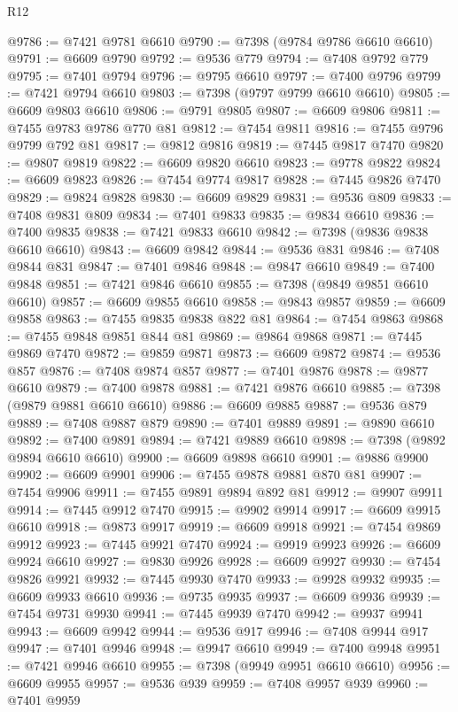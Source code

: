 \begin{lexlean}{R12}
\begin{coremodule}
@9786 := @7421 @9781 @6610
@9790 := @7398 (@9784 @9786 @6610 @6610)
@9791 := @6609 @9790
@9792 := @9536 @779
@9794 := @7408 @9792 @779
@9795 := @7401 @9794
@9796 := @9795 @6610
@9797 := @7400 @9796
@9799 := @7421 @9794 @6610
@9803 := @7398 (@9797 @9799 @6610 @6610)
@9805 := @6609 @9803 @6610
@9806 := @9791 @9805
@9807 := @6609 @9806
@9811 := @7455 @9783 @9786 @770 @81
@9812 := @7454 @9811
@9816 := @7455 @9796 @9799 @792 @81
@9817 := @9812 @9816
@9819 := @7445 @9817 @7470
@9820 := @9807 @9819
@9822 := @6609 @9820 @6610
@9823 := @9778 @9822
@9824 := @6609 @9823
@9826 := @7454 @9774 @9817
@9828 := @7445 @9826 @7470
@9829 := @9824 @9828
@9830 := @6609 @9829
@9831 := @9536 @809
@9833 := @7408 @9831 @809
@9834 := @7401 @9833
@9835 := @9834 @6610
@9836 := @7400 @9835
@9838 := @7421 @9833 @6610
@9842 := @7398 (@9836 @9838 @6610 @6610)
@9843 := @6609 @9842
@9844 := @9536 @831
@9846 := @7408 @9844 @831
@9847 := @7401 @9846
@9848 := @9847 @6610
@9849 := @7400 @9848
@9851 := @7421 @9846 @6610
@9855 := @7398 (@9849 @9851 @6610 @6610)
@9857 := @6609 @9855 @6610
@9858 := @9843 @9857
@9859 := @6609 @9858
@9863 := @7455 @9835 @9838 @822 @81
@9864 := @7454 @9863
@9868 := @7455 @9848 @9851 @844 @81
@9869 := @9864 @9868
@9871 := @7445 @9869 @7470
@9872 := @9859 @9871
@9873 := @6609 @9872
@9874 := @9536 @857
@9876 := @7408 @9874 @857
@9877 := @7401 @9876
@9878 := @9877 @6610
@9879 := @7400 @9878
@9881 := @7421 @9876 @6610
@9885 := @7398 (@9879 @9881 @6610 @6610)
@9886 := @6609 @9885
@9887 := @9536 @879
@9889 := @7408 @9887 @879
@9890 := @7401 @9889
@9891 := @9890 @6610
@9892 := @7400 @9891
@9894 := @7421 @9889 @6610
@9898 := @7398 (@9892 @9894 @6610 @6610)
@9900 := @6609 @9898 @6610
@9901 := @9886 @9900
@9902 := @6609 @9901
@9906 := @7455 @9878 @9881 @870 @81
@9907 := @7454 @9906
@9911 := @7455 @9891 @9894 @892 @81
@9912 := @9907 @9911
@9914 := @7445 @9912 @7470
@9915 := @9902 @9914
@9917 := @6609 @9915 @6610
@9918 := @9873 @9917
@9919 := @6609 @9918
@9921 := @7454 @9869 @9912
@9923 := @7445 @9921 @7470
@9924 := @9919 @9923
@9926 := @6609 @9924 @6610
@9927 := @9830 @9926
@9928 := @6609 @9927
@9930 := @7454 @9826 @9921
@9932 := @7445 @9930 @7470
@9933 := @9928 @9932
@9935 := @6609 @9933 @6610
@9936 := @9735 @9935
@9937 := @6609 @9936
@9939 := @7454 @9731 @9930
@9941 := @7445 @9939 @7470
@9942 := @9937 @9941
@9943 := @6609 @9942
@9944 := @9536 @917
@9946 := @7408 @9944 @917
@9947 := @7401 @9946
@9948 := @9947 @6610
@9949 := @7400 @9948
@9951 := @7421 @9946 @6610
@9955 := @7398 (@9949 @9951 @6610 @6610)
@9956 := @6609 @9955
@9957 := @9536 @939
@9959 := @7408 @9957 @939
@9960 := @7401 @9959

\end{coremodule}
\end{lexlean}
